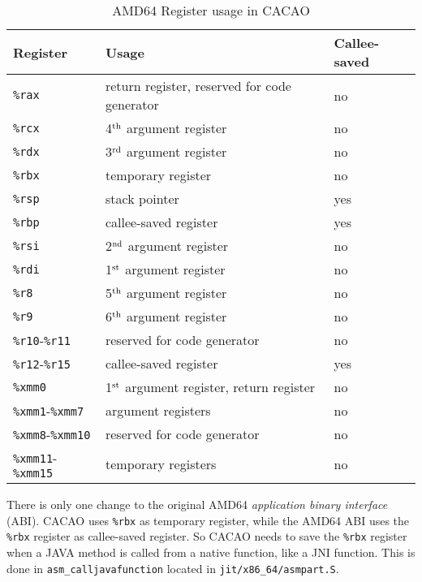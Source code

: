 \begin{table}
\begin{center}
\begin{tabular}{l|l|l}
Register       & Usage                                         & Callee-saved \\ \hline
\texttt{\%rax} & return register, reserved for code generator  & no           \\
\texttt{\%rcx} & 4$^{\rm th}$ argument register                & no           \\
\texttt{\%rdx} & 3$^{\rm rd}$ argument register                & no           \\
\texttt{\%rbx} & temporary register                            & no           \\
\texttt{\%rsp} & stack pointer                                 & yes          \\
\texttt{\%rbp} & callee-saved register                         & yes          \\
\texttt{\%rsi} & 2$^{\rm nd}$ argument register                & no           \\
\texttt{\%rdi} & 1$^{\rm st}$ argument register                & no           \\
\texttt{\%r8}  & 5$^{\rm th}$ argument register                & no           \\
\texttt{\%r9}  & 6$^{\rm th}$ argument register                & no           \\
\texttt{\%r10}-\texttt{\%r11} & reserved for code generator    & no           \\
\texttt{\%r12}-\texttt{\%r15} & callee-saved register          & yes          \\
\texttt{\%xmm0} & 1$^{\rm st}$ argument register, return register & no        \\
\texttt{\%xmm1}-\texttt{\%xmm7} & argument registers           & no           \\
\texttt{\%xmm8}-\texttt{\%xmm10} & reserved for code generator & no           \\
\texttt{\%xmm11}-\texttt{\%xmm15} & temporary registers        & no           \\
\end{tabular}
\caption{AMD64 Register usage in CACAO}
\label{amd64registerusage}
\end{center}
\end{table}

There is only one change to the original AMD64 \textit{application
binary interface} (ABI). CACAO uses \texttt{\%rbx} as temporary
register, while the AMD64 ABI uses the \texttt{\%rbx} register as
callee-saved register. So CACAO needs to save the \texttt{\%rbx}
register when a JAVA method is called from a native function, like a
JNI function. This is done in \texttt{asm\_calljavafunction} located in
\texttt{jit/x86\_64/asmpart.S}.

